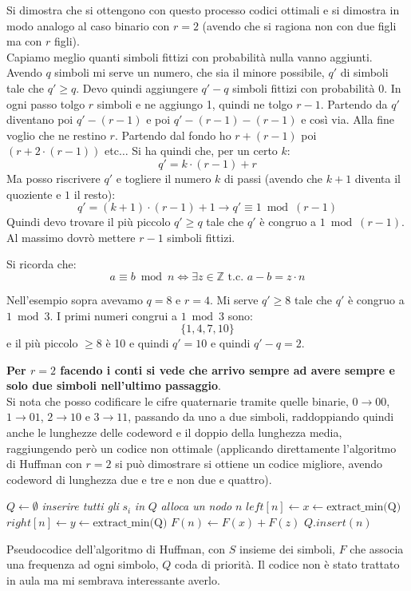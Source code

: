\documentclass[a4paper,12pt, oneside]{book}
\begin{document}
Si dimostra che si ottengono con questo processo codici ottimali e si dimostra
in modo analogo al caso binario con $r=2$ (avendo che si ragiona non con due
figli ma con $r$ figli).\\
Capiamo meglio quanti simboli fittizi con probabilità nulla vanno aggiunti.
Avendo $q$ simboli mi serve un numero, che sia il minore possibile, $q'$ di
simboli tale che $q'\geq q$. Devo quindi aggiungere $q'-q$ simboli fittizi con
probabilità 0. In ogni passo tolgo $r$ simboli e ne aggiungo 1, quindi ne tolgo
$r-1$. Partendo da $q'$ diventano poi $q'-(r-1)$ e poi $q'-(r-1)-(r-1)$ e così
via. Alla fine voglio che ne restino $r$. Partendo dal fondo ho $r+(r-1)$ poi
$(r+2\cdot (r-1))$ etc$\ldots$ Si ha quindi che, per un certo $k$:
\[q'=k\cdot(r-1)+r\]
Ma posso riscrivere $q'$ e togliere il numero $k$ di passi (avendo che $k+1$
diventa il quoziente e $1$ il resto):
\[q'=(k+1)\cdot (r-1)+1\to q' \equiv 1\bmod (r-1)\]
Quindi devo trovare il più piccolo $q'\geq q$ tale che $q'$ è congruo a $1\bmod
(r-1)$. Al massimo dovrò mettere $r-1$ simboli fittizi.
\begin{shaded}
  Si ricorda che:
  \[a\equiv b\bmod n\iff \exists z\in\mathbb{Z}\mbox{ t.c. }a-b=z\cdot n\]
\end{shaded}
\begin{esempio}
  Nell'esempio sopra avevamo $q=8$ e $r=4$. Mi serve $q'\geq 8$ tale che $q'$ è
  congruo a $1\bmod 3$. I primi numeri congrui a $1\bmod 3$ sono:
  \[\{1,4,7,10\}\]
  e il più piccolo $\geq 8$ è 10 e quindi $q'=10$ e quindi $q'-q=2$. 
\end{esempio}
\textbf{Per $r=2$ facendo i conti si vede che arrivo sempre ad avere sempre e
  solo due simboli nell'ultimo passaggio}.\\
Si nota che posso codificare le cifre quaternarie tramite quelle binarie, $0\to
00$, $1\to 01$, $2\to 10$ e $3\to 11$, passando da uno a due simboli,
raddoppiando quindi anche le lunghezze delle codeword e il doppio della
lunghezza media, raggiungendo però un codice non ottimale (applicando
direttamente l'algoritmo di Huffman con $r=2$ si può dimostrare si ottiene un
codice migliore, avendo codeword di lunghezza due e tre e non due e quattro).\\
\begin{algorithm}
  \begin{algorithmic}
    \State $Q\gets \emptyset$
    \State \textit{inserire tutti gli} $s_i$ \textit{in} $Q$
    \State \textit{alloca un nodo} $n$
    \State $left[n]\gets x\gets\mbox{extract\_min(Q)}$
    \State $right[n]\gets y\gets \mbox{extract\_min(Q)}$
    \State $F(n)\gets F(x)+F(z)$
    \State $Q.insert(n)$
    \EndFor
    \EndFunction
  \end{algorithmic}
  \caption{Pseudocodice dell'algoritmo di Huffman, con $S$ insieme dei simboli,
  $F$ che associa una frequenza ad ogni simbolo, $Q$ coda di priorità. Il codice
  non è stato trattato in aula ma mi sembrava interessante averlo.}
\end{algorithm}
\end{document}
